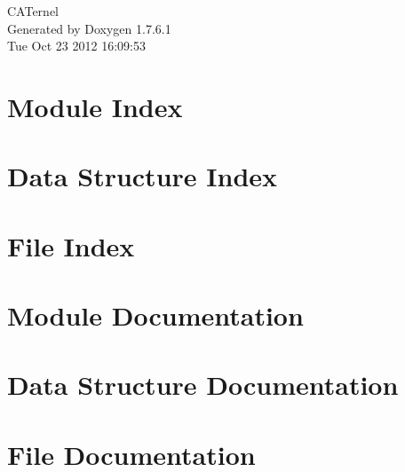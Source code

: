 \documentclass[a4paper]{book}
\begin{document}
\hypersetup{pageanchor=false,citecolor=blue}
\begin{titlepage}
\vspace*{7cm}
\begin{center}
{\Large \-C\-A\-Ternel }\\
\vspace*{1cm}
{\large \-Generated by Doxygen 1.7.6.1}\\
\vspace*{0.5cm}
{\small Tue Oct 23 2012 16:09:53}\\
\end{center}
\end{titlepage}
\clearemptydoublepage
{}
\tableofcontents
\clearemptydoublepage
{}
\hypersetup{pageanchor=true,citecolor=blue}
\chapter{\-Module \-Index}

\chapter{\-Data \-Structure \-Index}

\chapter{\-File \-Index}

\chapter{\-Module \-Documentation}

\chapter{\-Data \-Structure \-Documentation}

















\chapter{\-File \-Documentation}













































\printindex
\end{document}
